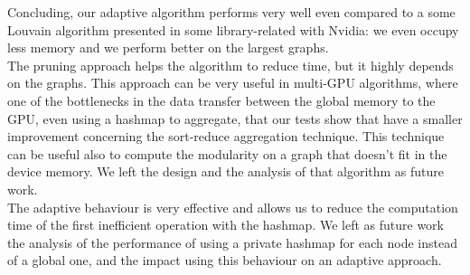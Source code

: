 Concluding, our adaptive algorithm performs very well even compared to a some Louvain algorithm presented in some library-related with Nvidia: we even occupy less memory and we perform better on the largest graphs.\\ The pruning approach helps the algorithm to reduce time, but it highly depends on the graphs. This approach can be very useful in multi-GPU algorithms, where one of the bottlenecks in the data transfer between the global memory to the GPU, even using a hashmap to aggregate, that our tests show that have a smaller improvement concerning the sort-reduce aggregation technique. This technique can be useful also to compute the modularity on a graph that doesn't fit in the device memory. We left the design and the analysis of that algorithm as future work. \\
The adaptive behaviour is very effective and allows us to reduce the computation time of the first inefficient operation with the hashmap. We left as future work the analysis of the performance of using a private hashmap for each node instead of a global one, and the impact using this behaviour on an adaptive approach.

